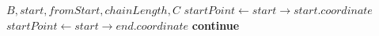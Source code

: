 \begin{algorithm}[ht]
\caption{}
\label{alg:findchainoflines1}
\begin{algorithmic}[1]
	\Require $B,\mathit{start},\mathit{fromStart},\mathit{chainLength},C$
		\State $\mathit{startPoint} \gets \mathit{start \to start.coordinate}$
	\Else
		\State $\mathit{startPoint} \gets \mathit{start \to end.coordinate}$
	\EndIf
			\State \textbf{continue}
		\EndIf
\end{algorithmic}
\end{algorithm}
